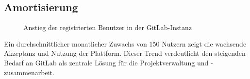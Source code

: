 \subsection{Amortisierung}
\label{app:User}
\begin{figure}[htb]
    \centering
    \caption{Anstieg der registrierten Benutzer in der GitLab-Instanz}
    \label{fig:totalUser}
    \end{figure}
    
Ein durchschnittlicher monatlicher Zuwachs von 150 Nutzern zeigt die wachsende Akzeptanz und Nutzung der Plattform. Dieser Trend verdeutlicht den steigenden Bedarf an GitLab als zentrale Lösung für die Projektverwaltung und -zusammenarbeit.
    